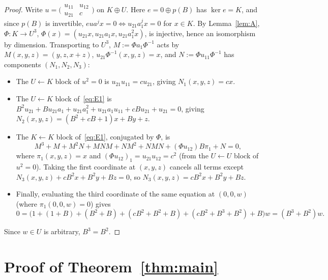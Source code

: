 \documentclass[11pt]{article}
\begin{document}
\begin{proof}
Write $u = \bigl(\begin{smallmatrix} u_{11} & u_{12} \\ u_{21} & c \end{smallmatrix}\bigr)$ on $K \oplus U$. Here $e = 0 \oplus p(B)$ has $\ker e = K$, and since $p(B)$ is invertible, $eu a^j x = 0 \iff u_{21} a_1^j x = 0$ for $x \in K$. By Lemma~\ref{lem:A}, $\Phi : K \to U^3$, $\Phi(x) = (u_{21}x, u_{21}a_1x, u_{21}a_1^2x)$, is injective, hence an isomorphism by dimension. Transporting to $U^3$, $M := \Phi a_1 \Phi^{-1}$ acts by $M(x, y, z) = (y, z, x + z)$, $u_{21}\Phi^{-1}(x, y, z) = x$, and $N := \Phi u_{11} \Phi^{-1}$ has components $(N_1, N_2, N_3)$:
\begin{itemize}
  \item The $U \leftarrow K$ block of $u^2 = 0$ is $u_{21} u_{11} = c u_{21}$, giving $N_1(x, y, z) = cx$.
  \item The $U \leftarrow K$ block of~\eqref{eq:E1} is $B^2 u_{21} + B u_{21} a_1 + u_{21} a_1^2 + u_{21} a_1 u_{11} + c B u_{21} + u_{21} = 0$, giving $N_2(x, y, z) = (B^2 + cB + 1)x + By + z$.
  \item The $K \leftarrow K$ block of~\eqref{eq:E1}, conjugated by $\Phi$, is
  \[
    M^3 + M + M^2 N + M N M + N M^2 + N M N + (\Phi u_{12}) B \pi_1 + N = 0,
  \]
  where $\pi_1(x, y, z) = x$ and $(\Phi u_{12})_1 = u_{21} u_{12} = c^2$ (from the $U \leftarrow U$ block of $u^2 = 0$). Taking the first coordinate at $(x, y, z)$ cancels all terms except $N_3(x, y, z) + cB^2 x + B^2 y + Bz = 0$, so $N_3(x, y, z) = cB^2 x + B^2 y + Bz$.
  \item Finally, evaluating the third coordinate of the same equation at $(0, 0, w)$ (where $\pi_1(0, 0, w) = 0$) gives
  \[
    0 = \bigl(1 + (1 + B) + (B^2 + B) + (cB^2 + B^2 + B) + (cB^2 + B^3 + B^2) + B\bigr)w = (B^3 + B^2)w.
  \]
\end{itemize}
Since $w \in U$ is arbitrary, $B^3 = B^2$.
\end{proof}

\section{Proof of Theorem~\ref{thm:main}}
\end{document}
